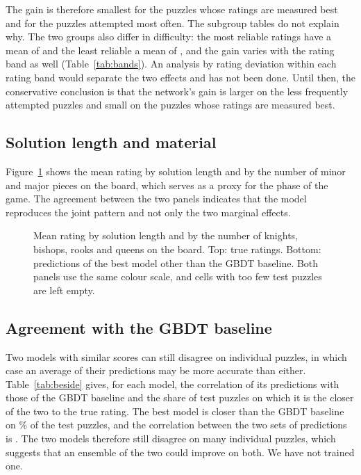 \documentclass[11pt]{article}
\begin{document}
The gain is therefore smallest for the puzzles whose ratings are measured
best and for the puzzles attempted most often. The subgroup tables do not
explain why. The two groups also differ in difficulty: the most reliable
ratings have a mean of  and the least
reliable a mean of , and the gain varies with
the rating band as well (Table~\ref{tab:bands}). An analysis by rating
deviation within each rating band would separate the two effects and has not
been done. Until then, the conservative conclusion is that the network's
gain is larger on the less frequently attempted puzzles and small on the
puzzles whose ratings are measured best.

\subsection{Solution length and material}

Figure~\ref{fig:grid} shows the mean rating by solution length and by the
number of minor and major pieces on the board, which serves as a proxy for
the phase of the game. The agreement between the two panels indicates that
the model reproduces the joint pattern and not only the two marginal
effects.

\begin{figure}[htbp]\centering
{}

\medskip
{}
\caption{Mean rating by solution length and by the number of knights,
bishops, rooks and queens on the board. Top: true ratings. Bottom:
predictions of the best model other than the GBDT baseline. Both panels use
the same colour scale, and cells with too few test puzzles are left empty.}
\label{fig:grid}
\end{figure}

\subsection{Agreement with the GBDT baseline}

Two models with similar scores can still disagree on individual puzzles, in
which case an average of their predictions may be more accurate than either.
Table~\ref{tab:beside} gives, for each model, the correlation of its
predictions with those of the GBDT baseline and the share of test puzzles on
which it is the closer of the two to the true rating. The best model is
closer than the GBDT baseline on \% of the test
puzzles, and the correlation between the two sets of predictions is
. The two models therefore still disagree on many
individual puzzles, which suggests that an ensemble of the two could improve
on both. We have not trained one.
\end{document}
